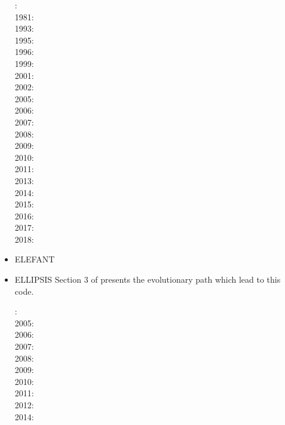 \begin{itemize}
{\small
{}: \cite{mera80}\\
1981: \cite{mera81}\\
1993: \cite{gowo93}\\
1995: \cite{gowo95}\\
1996: \cite{guez96}\cite{gisb96}\\
1999: \cite{gowo99}\cite{fugo99}\\
2001: \cite{bugw01}\cite{gome01}\\
2002: \cite{bugw02}\\
2005: \cite{gowo05}\cite{vanw05}\cite{vabl05}\cite{gowo05}\\
2006: \cite{degw06}\cite{libi06}\cite{scdm06}\\
2007: \cite{vabl07}\\
2008: \cite{degw08}\cite{degw08b}\\
2009: \cite{ladg09}\cite{plmg09}\\
2010: \cite{vago10}\cite{plmf10}\\
2011: \cite{bagw11}\cite{bagw11b}\\
2013: \cite{plab13}\cite{wagw13}\\
2014: \cite{vagw14}\\
2015: \cite{mags15}\cite{nigo15}\\
2016: \cite{gemg16}\cite{masg16}\\
2017: \cite{ozgw17}\\
2018: \cite{gofv18}\cite{nigw18}\cite{hefg18}
}

\item {\codefont ELEFANT} 

{\small
\noindent
\cite{tosn15}
\cite{matv15}
\cite{busa16}
\cite{latb17}
\cite{thie17}
\cite{pltv18}
\cite{wohu19}
\cite{frtv19}
}

\item {\codefont ELLIPSIS} 
Section 3 of \cite{qums07} presents the evolutionary path which lead to this code.

{\small
{}: \cite{modm03}\cite{wibm03}\cite{mumc03}\cite{wemv03}\cite{onmo03}\\
2005: \cite{wiwg05}\cite{onml05}\cite{onmj05}\\
2006: \cite{onmm06} \\
2007: \cite{moql07}\cite{gewm07}\cite{dyrm07}\cite{onlm07}\\
2008: \cite{onlg08}\\
2009: \cite{onlj09}\\
2010: \cite{pyeg10}\\
2011: \cite{legu11}\\
2012: \cite{lega12}\\
2014: \cite{recf14}
}


\end{itemize}
